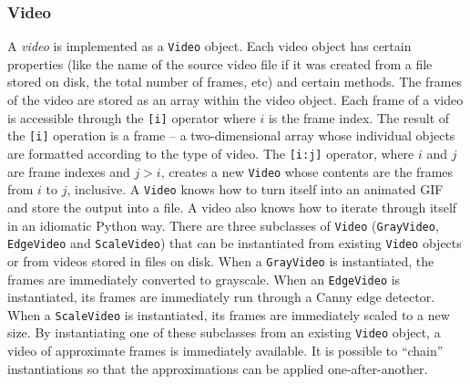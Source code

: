 \subsubsection{Video}
\label{sec:Video}
A \textit{video} is implemented as a \texttt{Video} object. Each video object has certain properties (like the name of the source video file if it was created from a file stored on disk, the total number of frames, etc) and certain methods. 
The frames of the video are stored as an array within the video object. Each frame of a video is accessible through the \texttt{[i]} operator where $i$ is the frame index. The result of the \texttt{[i]} operation is a frame -- a two-dimensional array whose individual objects are formatted according to the type of video. The \texttt{[i:j]} operator, where $i$ and $j$ are frame indexes and $j>i$, creates a new \texttt{Video} whose contents are the frames from $i$ to $j$, inclusive. 
A \texttt{Video} knows how to turn itself into an animated GIF and store the output into a file. A video also knows how to iterate through itself in an idiomatic Python way. 
There are three subclasses of \texttt{Video} (\texttt{GrayVideo}, \texttt{EdgeVideo} and \texttt{ScaleVideo}) that can be instantiated from existing \texttt{Video} objects or from videos stored in files on disk. When a \texttt{GrayVideo} is instantiated, the frames are immediately converted to grayscale. When an \texttt{EdgeVideo} is instantiated, its frames are immediately run through a Canny edge detector. When a \texttt{ScaleVideo} is instantiated, its frames are immediately scaled to a new size. By instantiating one of these subclasses from an existing \texttt{Video} object, a video of approximate frames is immediately available. It is possible to ``chain'' instantiations so that the approximations can be applied one-after-another. 
